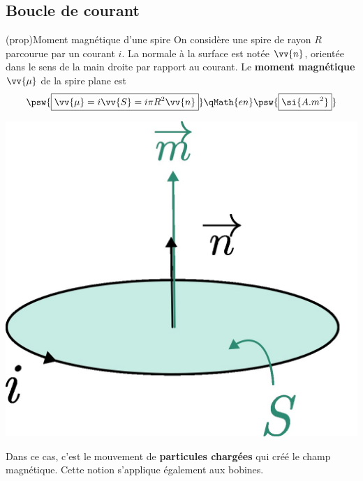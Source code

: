 \documentclass[../../main/main.tex]{subfiles}
\begin{document}
\subsection{Boucle de courant}
\label{ssec:magboucle}
\begin{tcb*}[sidebyside, righthand ratio=.2](prop){Moment magnétique d'une spire}
			On considère une spire de rayon $R$ parcourue par un courant $i$. La normale à
			la surface est notée $\vv{n}$, orientée dans le sens de la main droite par
			rapport au courant.
			\smallbreak
			Le \textbf{moment magnétique} $\vv{\mu}$ de la spire plane est
              \[
              \psw{\boxed{\vv{\mu} = i \vv{S} = i\pi R^2 \vv{n}}}
              \qMath{en}
              \psw{\boxed{\si{A.m^2}}}
            \]
	\tcblower
		\begin{center}
			\includegraphics[width=\linewidth]{momag_spire}
		\end{center}
  \end{tcb*}

Dans ce cas, c'est le mouvement de \textbf{particules chargées} qui créé le
champ magnétique. Cette notion s'applique également aux bobines.
\end{document}
